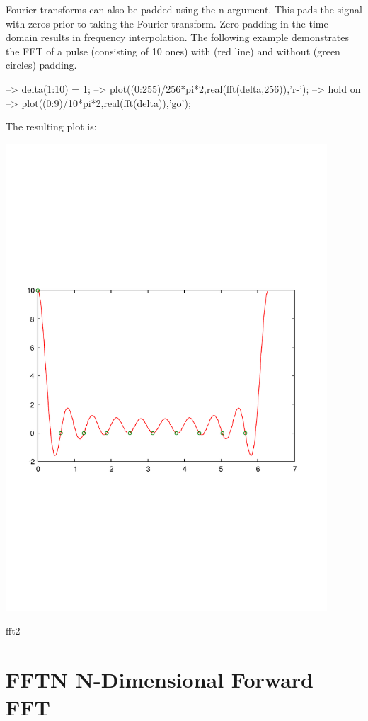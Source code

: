 Fourier transforms can also be padded using the {\ttfamily n} argument. This pads the signal with zeros prior to taking the Fourier transform. Zero padding in the time domain results in frequency interpolation. The following example demonstrates the F\-F\-T of a pulse (consisting of 10 ones) with (red line) and without (green circles) padding.


\begin{DoxyVerbInclude}
--> delta(1:10) = 1;
--> plot((0:255)/256*pi*2,real(fft(delta,256)),'r-');
--> hold on
--> plot((0:9)/10*pi*2,real(fft(delta)),'go');
\end{DoxyVerbInclude}


The resulting plot is\-:  
\begin{DoxyImage}
\includegraphics[width=12cm]{fft2}
\caption{fft2}
\end{DoxyImage}
 \hypertarget{transforms_fftn}{}\section{F\-F\-T\-N N-\/\-Dimensional Forward F\-F\-T}\label{transforms_fftn}
